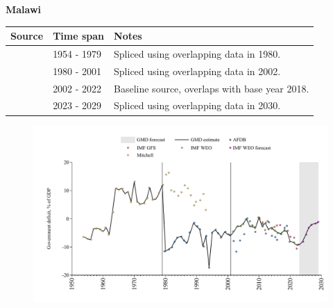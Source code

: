 \documentclass[12pt,a4paper,landscape]{article}
\begin{document}
\begin{adjustbox}{max totalsize={\paperwidth}{\paperheight},center}
\begin{minipage}[t][\textheight][t]{\textwidth}
\vspace*{0.5cm}
{}
\begin{center}
{\Large\bfseries Malawi}
\end{center}
\vspace{0.5cm}
\begin{table}[H]
\centering
\small
\begin{tabular}{|l|l|l|}
\hline
\textbf{Source} & \textbf{Time span} & \textbf{Notes} \\
\hline
\rowcolor{white}\cite{Mitchell}& 1954 - 1979 &Spliced using overlapping data in 1980.\\
\rowcolor{lightgray}\cite{AFDB}& 1980 - 2001 &Spliced using overlapping data in 2002.\\
\rowcolor{white}\cite{IMF_WEO}& 2002 - 2022 &Baseline source, overlaps with base year 2018.\\
\rowcolor{lightgray}\cite{IMF_WEO_forecast}& 2023 - 2029 &Spliced using overlapping data in 2030.\\
\hline
\end{tabular}
\end{table}
\begin{figure}[H]
\centering
\includegraphics[width=\textwidth,height=0.6\textheight,keepaspectratio]{graphs/MWI_govdef_GDP.pdf}
\end{figure}
\end{minipage}
\end{adjustbox}
\end{document}
